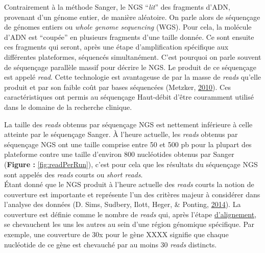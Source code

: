 \documentclass[12pt,twoside]{reedthesis}
\theoremstyle{definition}
\theoremstyle{definition}
\theoremstyle{remark}
\begin{document}
  Contrairement à la méthode Sanger, le NGS ``\emph{lit}'' des fragments
  d'ADN, provenant d'un génome entier, de manière aléatoire. On parle
  alors de séquençage de génomes entiers ou \emph{whole genome sequencing}
  (WGS). Pour cela, la molécule d'ADN est ``coupée'' en plusieurs
  fragments d'une taille donnée. Ce sont ensuite ces fragments qui seront,
  après une étape d'amplification spécifique aux différentes plateformes,
  séquencés simultanément. C'est pourquoi on parle souvent de séquençage
  parallèle massif pour décrire le NGS. Le produit de ce séquençage est
  appelé \emph{read}. Cette technologie est avantageuse de par la masse de
  \emph{reads} qu'elle produit et par son faible coût par bases séquencées
  (Metzker, \protect\hyperlink{ref-Metzker2010}{2010}). Ces
  caractéristiques ont permis au séquençage Haut-débit d'être couramment
  utilisé dans le domaine de la recherche clinique.
  
  La taille des \emph{reads} obtenus par séquençage NGS est nettement
  inférieure à celle atteinte par le séquençage Sanger. À l'heure
  actuelle, les \emph{reads} obtenus par séquençage NGS ont une taille
  comprise entre 50 et 500 pb pour la plupart des plateforme contre une
  taille d'environ 800 nucléotides obtenus par Sanger (\textbf{Figure :}
  \ref{fig:readPerRun}), c'est pour cela que les résultats du séquençage
  NGS sont appelés des \emph{reads} courts ou \emph{short reads}.\\
  Étant donné que le NGS produit à l'heure actuelle des \emph{reads}
  courts la notion de couverture est importante et représente l'un des
  critères majeur à considérer dans l'analyse des données (D. Sims,
  Sudbery, Ilott, Heger, \& Ponting,
  \protect\hyperlink{ref-Sims2014}{2014}). La couverture est définie comme
  le nombre de \emph{reads} qui, après l'étape
  \protect\hyperlink{lalignement}{d'alignement}, se chevauchent les uns
  les autres au sein d'une région génomique spécifique. Par exemple, une
  couverture de 30x pour le gène XXXX signifie que chaque nucléotide de ce
  gène est chevauché par au moins 30 \emph{reads} distincts.
  
\end{document}
